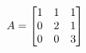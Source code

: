 \documentclass[preview]{standalone}
\begin{document}
\begin{align*}
\special{dvisvgm:raw <g id='unique000'>}A = \begin{bmatrix} 1 & 1 & 1 \\ 0 & 2 & 1 \\ 0 & 0 & 3 \end{bmatrix}\special{dvisvgm:raw </g>}
\end{align*}
\end{document}
